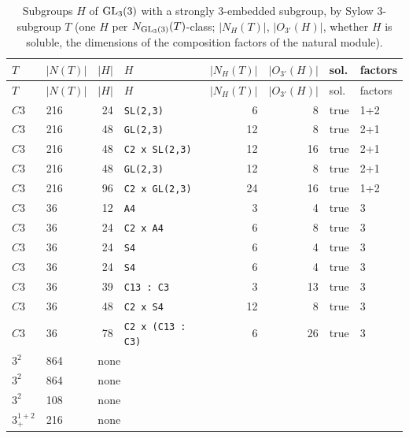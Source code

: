 \begin{longtable}{llrlrrll}
\caption{Subgroups $H$ of $\mathrm{GL}_3(3)$ with a strongly $3$-embedded subgroup, by Sylow $3$-subgroup $T$ (one $H$ per $N_{\mathrm{GL}_3(3)}(T)$-class; $|N_H(T)|$, $|O_{3'}(H)|$, whether $H$ is soluble, the dimensions of the composition factors of the natural module).}\label{tab:gl3}\\
\toprule
$T$ & $|N(T)|$ & $|H|$ & $H$ & $|N_H(T)|$ & $|O_{3'}(H)|$ & sol. & factors\\
\midrule
\endfirsthead
\toprule
$T$ & $|N(T)|$ & $|H|$ & $H$ & $|N_H(T)|$ & $|O_{3'}(H)|$ & sol. & factors\\
\midrule
\endhead
\bottomrule
\endfoot
$C3$ & 216 & 24 & \texttt{SL(2,3)} & 6 & 8 & true & 1+2\\
$C3$ & 216 & 48 & \texttt{GL(2,3)} & 12 & 8 & true & 2+1\\
$C3$ & 216 & 48 & \texttt{C2 x SL(2,3)} & 12 & 16 & true & 2+1\\
$C3$ & 216 & 48 & \texttt{GL(2,3)} & 12 & 8 & true & 2+1\\
$C3$ & 216 & 96 & \texttt{C2 x GL(2,3)} & 24 & 16 & true & 1+2\\
$C3$ & 36 & 12 & \texttt{A4} & 3 & 4 & true & 3\\
$C3$ & 36 & 24 & \texttt{C2 x A4} & 6 & 8 & true & 3\\
$C3$ & 36 & 24 & \texttt{S4} & 6 & 4 & true & 3\\
$C3$ & 36 & 24 & \texttt{S4} & 6 & 4 & true & 3\\
$C3$ & 36 & 39 & \texttt{C13 : C3} & 3 & 13 & true & 3\\
$C3$ & 36 & 48 & \texttt{C2 x S4} & 12 & 8 & true & 3\\
$C3$ & 36 & 78 & \texttt{C2 x (C13 : C3)} & 6 & 26 & true & 3\\
$3^2$ & 864 & \multicolumn{6}{l}{none}\\
$3^2$ & 864 & \multicolumn{6}{l}{none}\\
$3^2$ & 108 & \multicolumn{6}{l}{none}\\
$3^{1+2}_+$ & 216 & \multicolumn{6}{l}{none}\\
\end{longtable}
